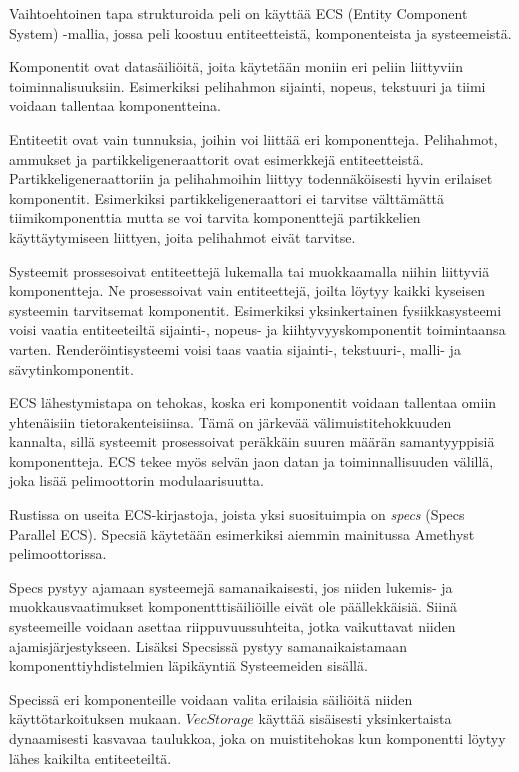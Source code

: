 \documentclass[finnish]{tktltiki2}
\theoremstyle{definition}
\theoremstyle{remark}
\begin{document}
Vaihtoehtoinen tapa strukturoida peli on käyttää ECS (Entity Component System) -mallia, jossa peli koostuu entiteetteistä, komponenteista ja systeemeistä.

Komponentit ovat datasäiliöitä, joita käytetään moniin eri peliin liittyviin toiminnalisuuksiin. Esimerkiksi pelihahmon sijainti, nopeus, tekstuuri ja tiimi voidaan tallentaa komponentteina.

Entiteetit ovat vain tunnuksia, joihin voi liittää eri komponentteja. Pelihahmot, ammukset ja partikkeligeneraattorit ovat esimerkkejä entiteetteistä. Partikkeligeneraattoriin ja pelihahmoihin liittyy todennäköisesti hyvin erilaiset komponentit. Esimerkiksi partikkeligeneraattori ei tarvitse välttämättä tiimikomponenttia mutta se voi tarvita komponenttejä partikkelien käyttäytymiseen liittyen, joita pelihahmot eivät tarvitse.

Systeemit prossesoivat entiteettejä lukemalla tai muokkaamalla niihin liittyviä komponentteja. Ne prosessoivat vain entiteettejä, joilta löytyy kaikki kyseisen systeemin tarvitsemat komponentit. Esimerkiksi yksinkertainen fysiikkasysteemi voisi vaatia entiteeteiltä sijainti-, nopeus- ja kiihtyvyyskomponentit toimintaansa varten. Renderöintisysteemi voisi taas vaatia sijainti-, tekstuuri-, malli- ja sävytinkomponentit.

ECS lähestymistapa on tehokas, koska eri komponentit voidaan tallentaa omiin yhtenäisiin tietorakenteisiinsa. Tämä on järkevää välimuistitehokkuuden kannalta, sillä systeemit prosessoivat peräkkäin suuren määrän samantyyppisiä komponentteja. ECS tekee myös selvän jaon datan ja toiminnallisuuden välillä, joka lisää pelimoottorin modulaarisuutta.

Rustissa on useita ECS-kirjastoja, joista yksi suosituimpia on \textit{specs} (Specs Parallel ECS)\cite{AreWeGameYetEcs}. Specsiä käytetään esimerkiksi aiemmin mainitussa Amethyst pelimoottorissa. 

Specs pystyy ajamaan systeemejä samanaikaisesti, jos niiden lukemis- ja muokkausvaatimukset komponentttisäiliöille eivät ole päällekkäisiä. Siinä systeemeille voidaan asettaa riippuvuussuhteita, jotka vaikuttavat niiden ajamisjärjestykseen. Lisäksi Specsissä pystyy samanaikaistamaan komponenttiyhdistelmien läpikäyntiä Systeemeiden sisällä.

Specissä eri komponenteille voidaan valita erilaisia säiliöitä niiden käyttötarkoituksen mukaan. $VecStorage$ käyttää sisäisesti yksinkertaista dynaamisesti kasvavaa taulukkoa, joka on muistitehokas kun komponentti löytyy lähes kaikilta entiteeteiltä. 
\end{document}
